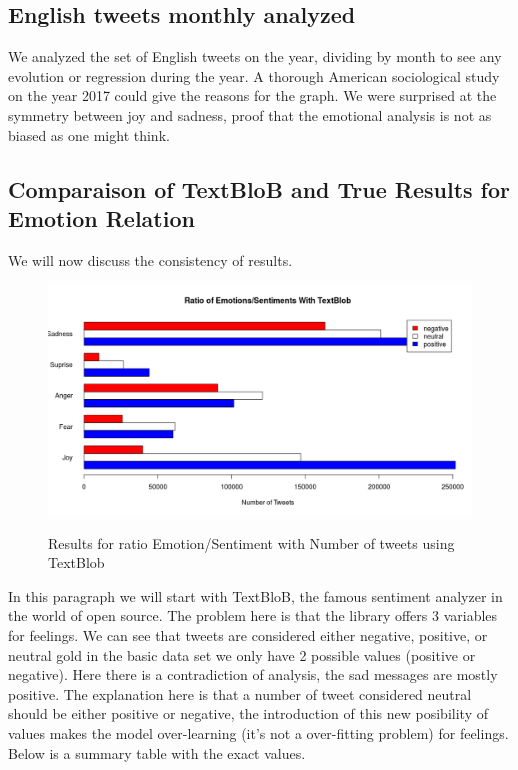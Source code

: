 \documentclass{acmtog} %
\begin{document}
\subsection{English tweets monthly analyzed}
\label{subsub:english_tweets_monthly}

We analyzed the set of English tweets on the year, dividing by month to see any evolution or regression during the year. A thorough American sociological study on the year 2017 could give the reasons for the graph. We were surprised at the symmetry between joy and sadness, proof that the emotional analysis is not as biased as one might think. 

\subsection{Comparaison of TextBloB and True Results for Emotion Relation}
\label{subsub:comparaisonEmotionRelation}

We will now discuss the consistency of results.

\begin{figure}[h!]
{\includegraphics[width=\linewidth]{ratio-textblob.png}}
\caption{Results for ratio Emotion/Sentiment with Number of tweets using TextBlob}
  \label{fig:contradiction_barplot}
\end{figure}

In this paragraph we will start with TextBloB, the famous sentiment analyzer in the world of open source. The problem here is that the library offers 3 variables for feelings. We can see that tweets are considered either negative, positive, or neutral gold in the basic data set we only have 2 possible values ​​(positive or negative). Here there is a contradiction of analysis, the sad messages are mostly positive. The explanation here is that a number of tweet considered neutral should be either positive or negative, the introduction of this new posibility of values ​​makes the model over-learning (it's not a over-fitting problem) for feelings. Below is a summary table with the exact values.
\end{document}
